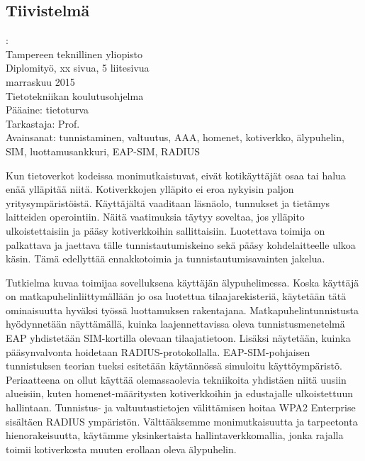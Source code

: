 \documentclass[12pt,a4paper,english]{tutthesis}
\begin{document}
\begin{otherlanguage}{finnish} %
\chapter*{Tiivistelmä}         %

\begin{spacing}{1.0}
         {\bf \textsf{\MakeUppercase{\@author}}}: \@titleB\\  %
         \textsf{Tampereen teknillinen yliopisto}\\
         \textsf{Diplomityö, xx sivua, 5 liitesivua}\\ %
         \textsf{marraskuu 2015}\\
         \textsf{Tietotekniikan koulutusohjelma}\\
         \textsf{Pääaine: tietoturva}\\
         \textsf{Tarkastaja:  Prof. \@examiner}\\ %
         \textsf{Avainsanat: tunnistaminen, valtuutus, AAA, homenet, kotiverkko, älypuhelin, SIM, luottamusankkuri, EAP-SIM, RADIUS}\\
\end{spacing}
Kun tietoverkot kodeissa monimutkaistuvat, eivät kotikäyttäjät
osaa tai halua enää ylläpitää niitä. Kotiverkkojen ylläpito ei
eroa nykyisin paljon yritysympäristöistä. Käyttäjältä vaaditaan
läsnäolo, tunnukset ja tietämys laitteiden operointiin. Näitä
vaatimuksia
täytyy soveltaa, jos ylläpito ulkoistettaisiin ja pääsy 
kotiverkkoihin sallittaisiin. Luotettava toimija on palkattava
ja jaettava tälle tunnistautumiskeino sekä pääsy kohdelaitteelle
ulkoa käsin. Tämä edellyttää ennakkotoimia ja tunnistautumisavainten jakelua.

Tutkielma kuvaa toimijaa sovelluksena käyttäjän älypuhelimessa.
Koska käyttäjä on matkapuhelinliittymällään jo osa luotettua
tilaajarekisteriä, käytetään tätä ominaisuutta hyväksi työssä 
luottamuksen rakentajana. Matkapuhelintunnistusta hyödynnetään 
näyttämällä, kuinka laajennettavissa oleva tunnistusmenetelmä
EAP yhdistetään SIM-kortilla olevaan tilaajatietoon. Lisäksi
näytetään, kuinka pääsynvalvonta hoidetaan RADIUS-protokollalla.
EAP-SIM-pohjaisen tunnistuksen teorian tueksi esitetään käytännössä
simuloitu käyttöympäristö. Periaatteena on ollut käyttää
olemassaolevia tekniikoita yhdistäen niitä uusiin alueisiin,
kuten homenet-määritysten kotiverkkoihin ja edustajalle ulkoistettuun
hallintaan. Tunnistus- ja valtuutustietojen välittämisen hoitaa
WPA2 Enterprise sisältäen RADIUS ympäristön. Välttääksemme 
monimutkaisuutta ja tarpeetonta hienorakeisuutta, käytämme yksinkertaista 
hallintaverkkomallia, jonka rajalla toimii kotiverkosta muuten
erollaan oleva älypuhelin.


\end{otherlanguage}
\end{document}
